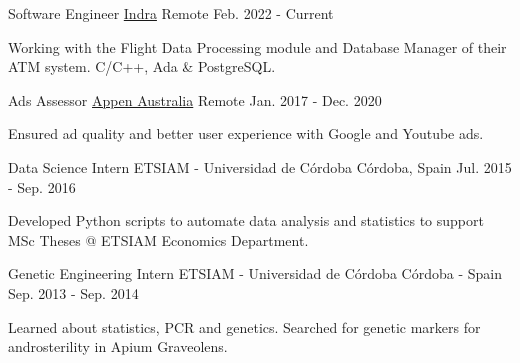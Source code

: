 

\begin{cventries}

  \cventry
    {Software Engineer}
    {\href{https://www.indracompany.com/en/air-traffic-control-automation-system-0}{Indra}}
    {Remote}
    {Feb. 2022 - Current}
     {
      \begin{cvitems}
      \item {Working with the Flight Data Processing module and Database Manager of their ATM system. C/C++, Ada \& PostgreSQL.}
      \end{cvitems}
    }

  \cventry
    {Ads Assessor}
    {\href{https://appen.com/}{Appen Australia}}
    {Remote}
    {Jan. 2017 - Dec. 2020}
     {
      \begin{cvitems}
        \item {Ensured ad quality and better user experience with Google and Youtube ads.}
      \end{cvitems}
    }

  \cventry
    {Data Science Intern}
    {ETSIAM - Universidad de Córdoba}
    {Córdoba, Spain}
    {Jul. 2015 - Sep. 2016}
     {
      \begin{cvitems}
        \item {Developed Python scripts to automate data analysis and statistics to support MSc Theses @ ETSIAM Economics Department.}
      \end{cvitems}
    }

  \cventry
    {Genetic Engineering Intern}
    {ETSIAM - Universidad de Córdoba}
    {Córdoba - Spain}
    {Sep. 2013 - Sep. 2014}
     {
      \begin{cvitems}
        \item {Learned about statistics, PCR and genetics. Searched for genetic markers for androsterility in Apium Graveolens.}
      \end{cvitems}
    }

\end{cventries}
